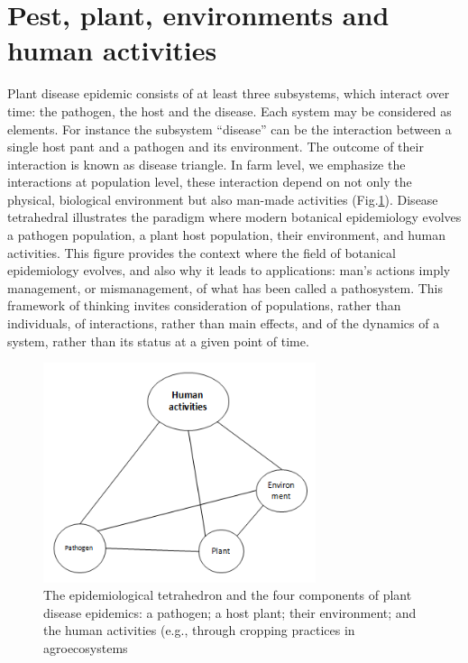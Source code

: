 \section*{Pest, plant, environments and human activities}
Plant disease epidemic consists of at least three subsystems, which interact over time: the pathogen, the host and the disease. Each system may be considered as elements. For instance the subsystem ``disease'' can be the interaction between a single host pant and a pathogen and its environment.  The outcome of their interaction is known as disease triangle. In farm level, we emphasize the interactions at population level, these interaction depend on not only the physical, biological environment but also man-made activities (Fig.\ref{fig:diseasetriangle}). Disease tetrahedral illustrates the paradigm where modern botanical epidemiology evolves a pathogen population, a plant host population, their environment, and human activities. This figure provides the context where the field of botanical epidemiology evolves, and also why it leads to applications: man’s actions imply management, or mismanagement, of what has been called a pathosystem. This framework of thinking invites consideration of populations, rather than individuals, of interactions, rather than main effects, and of the dynamics of a system, rather than its status at a given point of time.

\begin{figure}
\includegraphics[width=8cm]{distriangle}
\centering
\caption{The epidemiological tetrahedron and the four components of plant disease epidemics: a pathogen; a host plant; their environment; and the human activities (e.g., through cropping practices in agroecosystems}
\label{fig:diseasetriangle}
\end{figure}

